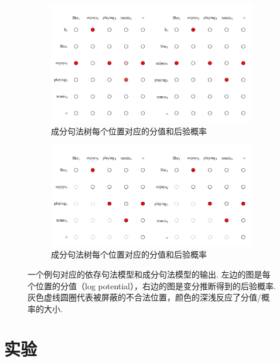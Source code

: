 \begin{figure}[tb]
    \centering
    \begin{subfigure}[b]{0.9\textwidth}
        \centering
        \includegraphics[scale=0.75]{figures/dep-probs.pdf}
        \caption{成分句法树每个位置对应的分值和后验概率}
        \label{fig:con-factors}
    \end{subfigure}
    \begin{subfigure}[b]{0.9\textwidth}
        \centering
        \includegraphics[scale=0.75]{figures/con-probs.pdf}
        \caption{成分句法树每个位置对应的分值和后验概率}
        \label{fig:dep-factors}
    \end{subfigure}
    \caption{一个例句对应的依存句法模型和成分句法模型的输出. 左边的图是每个位置的分值（log potential），右边的图是变分推断得到的后验概率. 灰色虚线圆圈代表被屏蔽的不合法位置，颜色的深浅反应了分值/概率的大小.}
    \label{fig:dep-vi-factors}
\end{figure}

\section{实验}\label{sec:dep-vi-exp}

